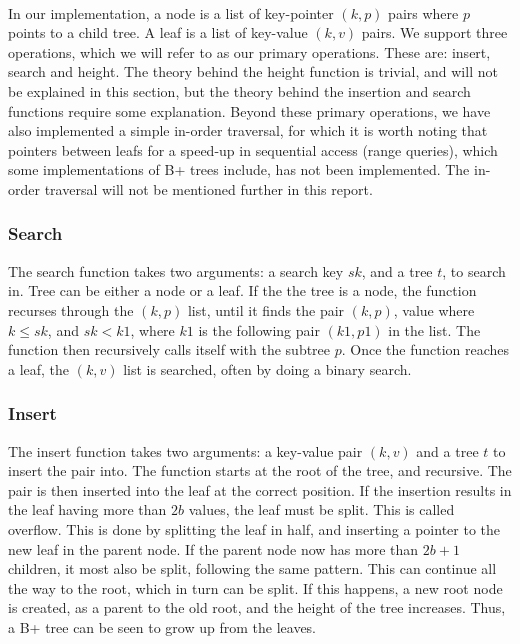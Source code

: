 \paragraph{}
In our implementation, a node is a list of key-pointer $(k, p)$ pairs where $p$ points to a child tree. A leaf is a list of key-value $(k, v)$ pairs. We support three operations, which we will refer to as our primary operations. These are: insert, search and height. The theory behind the height function is trivial, and will not be explained in this section, but the theory behind the insertion and search functions require some explanation. Beyond these primary operations, we have also implemented a simple in-order traversal, for which it is worth noting that pointers between leafs for a speed-up in sequential access (range queries), which some implementations of B+ trees include, has not been implemented. The in-order traversal will not be mentioned further in this report.

\subsubsection{Search}
The search function takes two arguments: a search key $sk$, and a tree $t$, to search in. Tree can be either a node or a leaf. If the the tree is a node, the function recurses through the $(k, p)$ list, until it finds the pair $(k, p)$, value where $k \le sk$, and $sk < k1$, where $k1$ is the following pair $(k1, p1)$ in the list. The function then recursively calls itself with the subtree $p$. Once the function reaches a leaf, the $(k, v)$ list is searched, often by doing a binary search.

\subsubsection{Insert}
The insert function takes two arguments: a key-value pair $(k, v)$ and a tree $t$ to insert the pair into. The function starts at the root of the tree, and recursive. The pair is then inserted into the leaf at the correct position. If the insertion results in the leaf having more than $2b$ values, the leaf must be split. This is called overflow. This is done by splitting the leaf in half, and inserting a pointer to the new leaf in the parent node. If the parent node now has more than $2b+1$ children, it most also be split, following the same pattern. This can continue all the way to the root, which in turn can be split. If this happens, a new root node is created, as a parent to the old root, and the height of the tree increases. Thus, a B+ tree can be seen to grow up from the leaves.
